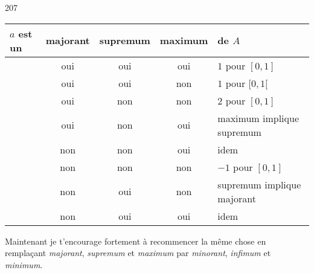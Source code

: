 \begin{corrige}{207}


\begin{center}
\begin{tabular}{l|c|c|c|l}
$a$ est un	&	majorant&	supremum	&	maximum	& de $A$\\\hline
		&	oui	&	oui		&	oui	&	$1$ pour $[0,1]$	\\ 
		&	oui	&	oui		&	non	&	$1$ pour $[0,1[$	\\ 
		&	oui	&	non		&	non	&	$2$ pour $[0,1]$	\\ 
		&	oui	&	non		&	oui	&	maximum implique supremum	\\ 
		&	non	&	non		&	oui	&	idem	\\ 
		&	non	&	non		&	non	&	$-1$ pour $[0,1]$	\\ 
		&	non	&	oui		&	non	&	supremum implique majorant	\\ 
		&	non	&	oui		&	oui	&	idem	\\ 
\end{tabular}
\end{center}
Maintenant je t'encourage fortement à recommencer la même chose en remplaçant \emph{majorant}, \emph{supremum} et \emph{maximum} par \emph{minorant}, \emph{infimum} et \emph{minimum}.
\end{corrige}


